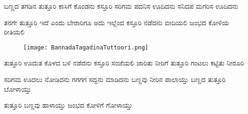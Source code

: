 \documentclass{article}
\begin{document}
\begin{poem}
\begin{stanza}
ಬಣ್ಣದ ತಗಡಿನ ತುತ್ತೂರಿ \verseline
ಕಾಸಿಗೆ ಕೊಂಡನು ಕಸ್ತೂರಿ \verseline
ಸರಿಗಮ ಪದನಿಸ ಊದಿದನು \verseline
ಸನಿದಪ ಮಗರಿಸ ಊದಿದನು
\end{stanza} 
\begin{stanza}
ತನಗೇ ತುತ್ತೂರಿ ಇದೆ ಎಂದು \verseline
ಬೇರಾರಿಗೂ ಅದು ಇಲ್ಲೆಂದ \verseline
ಕಸ್ತೂರಿ ನಡೆದನು ಬೀದಿಯಲಿ \verseline
ಜಂಭದ ಕೋಳಿಯ ರೀತಿಯಲಿ
\end{stanza}
\begin{figure}[h!]
    \centering
    \texttt{[image: BannadaTagadinaTuttoori.png]}
\end{figure}
\begin{stanza}
ತುತ್ತೂರಿ ಊದುತ ಕೊಳದ ಬಳಿ \verseline
ನಡೆದನು ಕಸ್ತೂರಿ ಸಂಜೆಯಲಿ \verseline
ಜಾರಿತು ನೀರಿಗೆ ತುತ್ತೂರಿ \verseline
ಗಂಟಲು ಕಟ್ಟಿತು ನೀರೂರಿ
\end{stanza}
\begin{stanza}
ಸರಿಗಮ ಊದಲು ನೋಡಿದನು \verseline
ಗಗಗಗ ಸದ್ದನು ಮಾಡಿದನು \verseline
ಬಣ್ಣವು ನೀರಿನ ಪಾಲಾಯ್ತು \verseline
ಬಣ್ಣದ ತುತ್ತೂರಿ ಬೋಳಾಯ್ತು
\end{stanza}
\begin{stanza}
ತುತ್ತೂರಿ ಬಣ್ಣವು ಹಾಳಾಯ್ತು \verseline
ಜಂಭದ ಕೋಳಿಗೆ ಗೋಳಾಯ್ತು
\end{stanza}
\end{poem}
\end{document}
